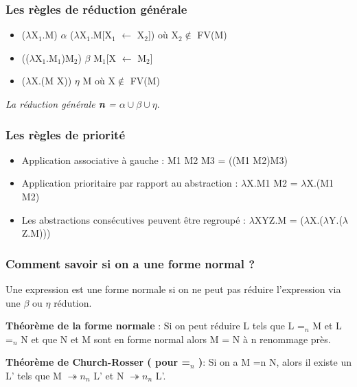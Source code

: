 \documentclass[10pt,a4paper]{article}
\begin{document}
				\subsubsection{Les règles de réduction générale}
					\begin{itemize}
						\item ($\lambda$X$_{1}$.M) $\alpha$ ($\lambda$X$_{1}$.M[X$_{1}$ $\leftarrow$ X$_{2}$])
						où X$_{2}$$\notin$  FV(M)
						\item (($\lambda$X$_{1}$.M$_{1}$)M$_{2}$) $\beta$ M$_{1}$[X $\leftarrow$ M$_{2}$]
						\item ($\lambda$X.(M X)) $\eta$ M 
						où X$\notin$  FV(M)
					\end{itemize}
				
				\textit{La réduction générale \textbf{n} = $\alpha \cup \beta \cup \eta$}.
				
				\subsubsection{Les règles de priorité}
					\begin{itemize}
						\item Application associative à gauche : M1 M2 M3 = ((M1 M2)M3)
						\item Application prioritaire par rapport au abstraction : $\lambda$X.M1 M2 =  $\lambda$X.(M1 M2)
						\item Les abstractions consécutives peuvent être regroupé : $\lambda$XYZ.M = ($\lambda$X.($\lambda$Y.($\lambda$Z.M)))
					\end{itemize}
				
				
				\subsubsection{Comment savoir si on a une forme normal ?}
				
				Une expression est une forme normale si on ne peut pas r\'{e}duire l'expression via une $\beta$ ou $\eta$ r\'{e}dution.
				\medbreak
				
				\textbf{Th\'{e}or\`{e}me de la forme normale} :
				Si on peut r\'{e}duire L tels que L =$_{n}$ M et L =$_{n}$ N et que N et M sont en forme normal alors M = N à n renommage pr\`{e}s.
				\medbreak	
				
				\textbf{Th\'{e}or\`{e}me de Church-Rosser ( pour =$_{n}$ )}:
				Si on a M =n N, alors il existe un L' tels que M $\twoheadrightarrow n_{n}$ L' et N $\twoheadrightarrow n_{n}$ L'.
				\medbreak
				
\end{document}
